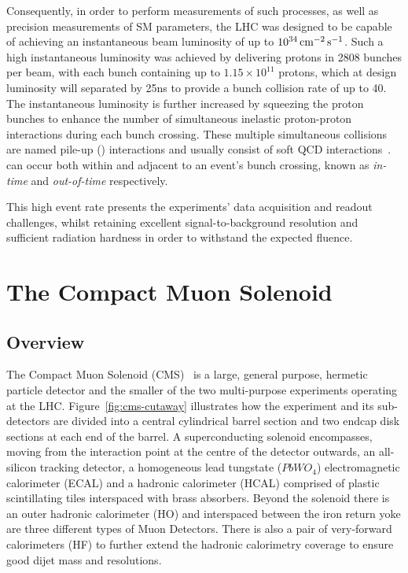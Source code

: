 Consequently, in order to perform measurements of such processes, as well as precision measurements of SM parameters, the LHC was designed to be capable of achieving an instantaneous beam luminosity of up to $10^{34}\,\text{cm}^\text{$-$2}\,\text{s}^\text{$-$1}$.
Such a high instantaneous luminosity was achieved by delivering protons in 2808 bunches per beam, with each bunch containing up to $1.15 \times 10^{11}$ protons, which at design luminosity will separated by 25ns to provide a bunch collision rate of up to 40\MHz.
The instantaneous luminosity is further increased by squeezing the proton bunches to enhance the number of simultaneous inelastic proton-proton interactions during each bunch crossing.
These multiple simultaneous collisions are named pile-up (\PU) interactions and usually consist of soft QCD interactions~\cite{Bruning:782076,Ball:2007zza}.
\PU can occur both within and adjacent to an event's bunch crossing, known as \emph{in-time} and \emph{out-of-time} \PU respectively.

This high event rate presents the experiments' data acquisition and readout challenges, whilst retaining excellent signal-to-background resolution and sufficient radiation hardness in order to withstand the expected fluence.

\section{The Compact Muon Solenoid}\label{sec:cms}
\subsection{Overview}
The Compact Muon Solenoid (CMS)~\cite{oldcms} is a large, general purpose, hermetic particle detector and the smaller of the two multi-purpose experiments operating at the LHC.
Figure~\ref{fig:cms-cutaway} illustrates how the experiment and its sub-detectors are divided into a central cylindrical barrel section and two endcap disk sections at each end of the barrel.
A superconducting solenoid encompasses, moving from the interaction point at the centre of the detector outwards, an all-silicon tracking detector, a homogeneous lead tungstate ($PbWO_{4}$) electromagnetic calorimeter (ECAL) and a hadronic calorimeter (HCAL) comprised of plastic scintillating tiles interspaced with brass absorbers.
Beyond the solenoid there is an outer hadronic calorimeter (HO) and interspaced between the iron return yoke are three different types of Muon Detectors.
There is also a pair of very-forward calorimeters (HF) to further extend the hadronic calorimetry coverage to ensure good dijet mass and \MET resolutions.

